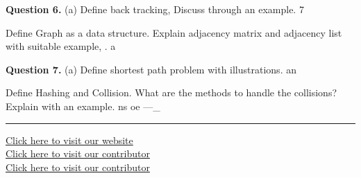\documentclass[11pt,a4paper]{article}
\begin{document}
\medskip\noindent\textbf{Question 6.} (a) Define back tracking, Discuss through an example. 7
\begin{parts}
  \item Define Graph as a data structure. Explain adjacency matrix and adjacency
  list with suitable example, . a
\end{parts}

\medskip\noindent\textbf{Question 7.} (a) Define shortest path problem with illustrations. an
\begin{parts}
  \item Define Hashing and Collision. What are the methods to handle the
  collisions? Explain with an example. ns
  oe —\_
\end{parts}

\vfill
\rule{\linewidth}{0.4pt}
\begin{center}\small
\href{https://bhu-exam.vercel.app/}{Click here to visit our website}\\[4pt]\href{https://me-aryan.vercel.app/}{Click here to visit our contributor}\\[4pt]\href{https://quashan-me.vercel.app/}{Click here to visit our contributor}
\end{center}
\end{document}
